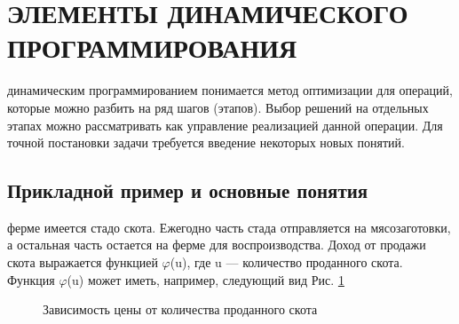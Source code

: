 \section{ЭЛЕМЕНТЫ ДИНАМИЧЕСКОГО ПРОГРАММИРОВАНИЯ}
 динамическим программированием понимается метод оптимизации для операций, которые можно разбить на ряд шагов (этапов). Выбор решений на отдельных этапах можно рассматривать как управление реализацией данной операции. Для точной постановки задачи требуется введение некоторых новых понятий.

\subsection{ Прикладной пример и основные понятия}

 ферме имеется стадо скота. Ежегодно часть стада отправляется на мясозаготовки, а остальная часть остается на ферме для воспроизводства. Доход от продажи скота выражается функцией $\varphi$(u), где u — количество  проданного  скота. Функция $\varphi$(u) может иметь, например, следующий вид Рис. \ref{picture_7_1}

\begin{figure}[h]
\caption{Зависимость цены от количества проданного скота}
\label{picture_7_1}
\end{figure}

